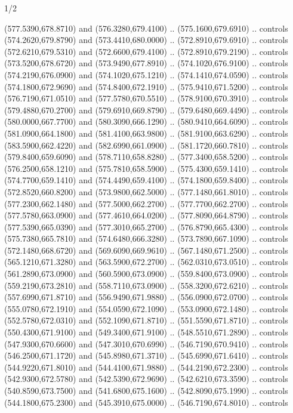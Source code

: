 \begin{flagdescription}{1/2}
\begin{scope}[xshift=0.5\flaglength]
\begin{scope}[scale=0.00745\flagwidth,xshift=-12.1mm,yshift=41.7mm]
\begin{scope}[y=0.80pt, x=0.80pt, yscale=-1, xscale=1, inner sep=0pt, outer sep=0pt]
\begin{scope}[cm={{1.33333,0.0,0.0,-1.33333,(0.0,114.66667)}}]
\begin{scope}[scale=0.100]
  (577.5390,678.8710) and (576.3280,679.4100) .. (575.1600,679.6910) .. controls
  (574.2620,679.8790) and (573.4410,680.0000) .. (572.8910,679.6910) .. controls
  (572.6210,679.5310) and (572.6600,679.4100) .. (572.8910,679.2190) .. controls
  (573.5200,678.6720) and (573.9490,677.8910) .. (574.1020,676.9100) .. controls
  (574.2190,676.0900) and (574.1020,675.1210) .. (574.1410,674.0590) .. controls
  (574.1800,672.9690) and (574.8400,672.1910) .. (575.9410,671.5200) .. controls
  (576.7190,671.0510) and (577.5780,670.5510) .. (578.9100,670.3910) .. controls
  (579.4880,670.2700) and (579.6910,669.8790) .. (579.6480,669.4490) .. controls
  (580.0000,667.7700) and (580.3090,666.1290) .. (580.9410,664.6090) .. controls
  (581.0900,664.1800) and (581.4100,663.9800) .. (581.9100,663.6290) .. controls
  (583.5900,662.4220) and (582.6990,661.0900) .. (581.1720,660.7810) .. controls
  (579.8400,659.6090) and (578.7110,658.8280) .. (577.3400,658.5200) .. controls
  (576.2500,658.1210) and (575.7810,658.5900) .. (575.4300,659.1410) .. controls
  (574.7700,659.1410) and (574.4490,659.4100) .. (574.1800,659.8400) .. controls
  (572.8520,660.8200) and (573.9800,662.5000) .. (577.1480,661.8010) .. controls
  (577.2300,662.1480) and (577.5000,662.2700) .. (577.7700,662.2700) .. controls
  (577.5780,663.0900) and (577.4610,664.0200) .. (577.8090,664.8790) .. controls
  (577.5390,665.0390) and (577.3010,665.2700) .. (576.8790,665.4300) .. controls
  (575.7380,665.7810) and (574.6480,666.3280) .. (573.7890,667.1090) .. controls
  (572.1480,668.6720) and (569.6090,669.9610) .. (567.1480,671.2500) .. controls
  (565.1210,671.3280) and (563.5900,672.2700) .. (562.0310,673.0510) .. controls
  (561.2890,673.0900) and (560.5900,673.0900) .. (559.8400,673.0900) .. controls
  (559.2190,673.2810) and (558.7110,673.0900) .. (558.3200,672.6210) .. controls
  (557.6990,671.8710) and (556.9490,671.9880) .. (556.0900,672.0700) .. controls
  (555.0780,672.1910) and (554.0590,672.1090) .. (553.0900,672.1480) .. controls
  (552.5780,672.0310) and (552.1090,671.8710) .. (551.5590,671.8710) .. controls
  (550.4300,671.9100) and (549.3400,671.9100) .. (548.5510,671.2890) .. controls
  (547.9300,670.6600) and (547.3010,670.6990) .. (546.7190,670.9410) .. controls
  (546.2500,671.1720) and (545.8980,671.3710) .. (545.6990,671.6410) .. controls
  (544.9220,671.8010) and (544.4100,671.9880) .. (544.2190,672.2300) .. controls
  (542.9300,672.5780) and (542.5390,672.9690) .. (542.6210,673.3590) .. controls
  (540.8590,673.7500) and (541.6800,675.1600) .. (542.8090,675.1990) .. controls
  (544.1800,675.2300) and (545.3910,675.0000) .. (546.7190,674.8010) .. controls

\end{scope}
\end{scope}
\end{scope}
\end{scope}
\end{scope}
\end{flagdescription}
